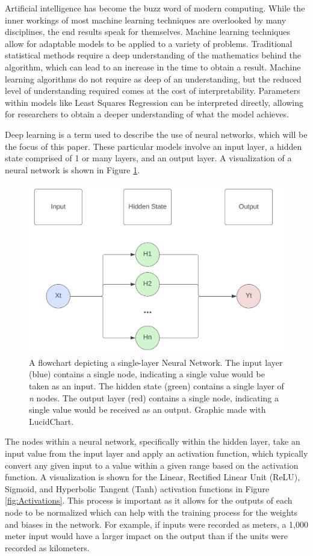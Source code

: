 Artificial intelligence has become the buzz word of modern computing. While the inner workings of most machine learning techniques are overlooked by many disciplines, the end results speak for themselves. Machine learning techniques allow for adaptable models to be applied to a variety of problems. Traditional statistical methods require a deep understanding of the mathematics behind the algorithm, which can lead to an increase in the time to obtain a result. Machine learning algorithms do not require as deep of an understanding, but the reduced level of understanding required comes at the cost of  interpretability. Parameters within models like Least Squares Regression can be interpreted directly, allowing for researchers to obtain a deeper understanding of what the model achieves. 

Deep learning is a term used to describe the use of neural networks, which will be the focus of this paper. These particular models involve an input layer, a hidden state comprised of 1 or many layers, and an output layer. A visualization of a neural network is shown in Figure \ref{fig:NueralNetwork}.

\begin{figure}[ht]
    \centering
    \includegraphics[width=0.6\linewidth]{"Figures/Traditional_NN.png"}
    \caption{A flowchart depicting a single-layer Neural Network. The input layer (blue) contains a single node, indicating a single value would be taken as an input. The hidden state (green) contains a single layer of \textit{n} nodes. The output layer (red) contains a single node, indicating a single value would be received as an output. Graphic made with LucidChart.}
    \label{fig:NueralNetwork}
\end{figure}

The nodes within a neural network, specifically within the hidden layer, take an input value from the input layer and apply an activation function, which typically convert any given input to a value within a given range based on the activation function. A visualization is shown for the Linear, Rectified Linear Unit (ReLU), Sigmoid, and Hyperbolic Tangent (Tanh) activation functions in Figure \ref{fig:Activations}. This process is important as it allows for the outputs of each node to be normalized which can help with the training process for the weights and biases in the network. For example, if inputs were recorded as meters, a 1,000 meter input would have a larger impact on the output than if the units were recorded as kilometers.

